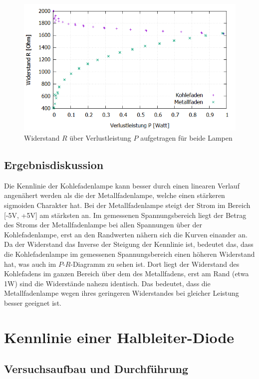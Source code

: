 \documentclass{scrartcl}
\begin{document}
\begin{figure}[H]
  \centering
    \includegraphics[scale=0.5]{V1_Leistung-Widerstand.PNG}
  \caption{Widerstand $R$ über Verlustleistung $P$ aufgetragen für beide Lampen}
  \label{fig:V1_Leistung-Widerstand}
\end{figure}
\subsection{Ergebnisdiskussion}
Die Kennlinie der Kohlefadenlampe kann besser durch einen linearen Verlauf angenähert werden als die der Metallfadenlampe, welche einen stärkeren sigmoiden Charakter hat. Bei der Metallfadenlampe steigt der Strom im Bereich [-5V, +5V] am stärksten an. Im gemessenen Spannungsbereich liegt der Betrag des Stroms der Metallfadenlampe bei allen Spannungen über der Kohlefadenlampe, erst an den Randwerten nähern sich die Kurven einander an. Da der Widerstand das Inverse der Steigung der Kennlinie ist, bedeutet das, dass die Kohlefadenlampe im gemessenen Spannungsbereich einen höheren Widerstand hat, was auch im $P$-$R$-Diagramm zu sehen ist. Dort liegt der Widerstand des Kohlefadens im ganzen Bereich über dem des Metallfadens, erst am Rand (etwa 1W) sind die Widerstände nahezu identisch. Das bedeutet, dass die Metallfadenlampe wegen ihres geringeren Widerstandes bei gleicher Leistung besser geeignet ist.



\pagebreak
\section{Kennlinie einer Halbleiter-Diode}
\subsection{Versuchsaufbau und Durchführung}
\end{document}
